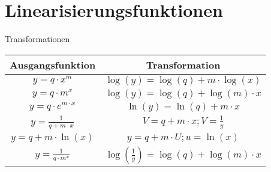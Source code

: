 \section{Linearisierungsfunktionen}
\begin{concept}{Transformationen}
\begin{center}
\begin{tabular}{|c|c|}
\hline
Ausgangsfunktion & Transformation \\
\hline
$y=q \cdot x^m$ & $\log(y)=\log(q)+m \cdot \log(x)$ \\
\hline
$y=q \cdot m^x$ & $\log(y)=\log(q)+\log(m) \cdot x$ \\
\hline
$y=q \cdot e^{m \cdot x}$ & $\ln(y)=\ln(q)+m \cdot x$ \\
\hline
$y=\frac{1}{q+m \cdot x}$ & $V=q+m \cdot x; V=\frac{1}{y}$ \\
\hline
$y=q+m \cdot \ln(x)$ & $y=q+m \cdot U; u=\ln(x)$ \\
\hline
$y=\frac{1}{q \cdot m^x}$ & $\log(\frac{1}{y})=\log(q)+\log(m) \cdot x$ \\
\hline
\end{tabular}
\end{center}
\end{concept}
